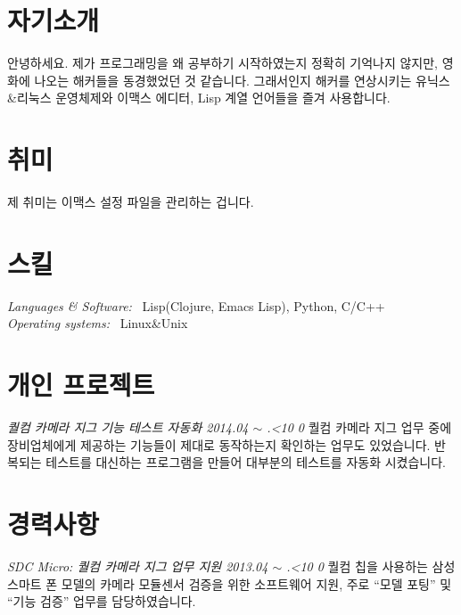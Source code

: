 \documentclass[line,margin]{res}
\renewcommand{\today}{\number\year.\ifnum\number\month<10 0\fi \number\month}
\begin{document}
\address{E-mail: vmfhrmfoaj@yahoo.com}


\begin{resume}

  \section{자기소개}

  안녕하세요.
  제가 프로그래밍을 왜 공부하기 시작하였는지 정확히 기억나지 않지만, 영화에 나오는 해커들을 동경했었던 것 같습니다.
  그래서인지 해커를 연상시키는 유닉스\&리눅스 운영체제와 이맥스 에디터, Lisp 계열 언어들을 즐겨 사용합니다.


  \section{취미}

  제 취미는 이맥스 설정 파일을 관리하는 겁니다.


  \section{스킬}

  {\sl Languages \& Software:} ~Lisp({\small Clojure, Emacs Lisp}), Python, C/C++ \\
  {\sl Operating systems:} ~Linux\&Unix


  \section{개인 프로젝트}

  {\sl 퀄컴 카메라 지그 기능 테스트 자동화 \hfill 2014.04 $\sim$ \today}
  \vspace{1mm}
  \newline
  {
    \small
    퀄컴 카메라 지그 업무 중에 장비업체에게 제공하는 기능들이 제대로 동작하는지 확인하는 업무도 있었습니다.
    반복되는 테스트를 대신하는 프로그램을 만들어 대부분의 테스트를 자동화 시켰습니다.
  }


  \section{경력사항}

  {\sl SDC Micro: 퀄컴 카메라 지그 업무 지원 \hfill 2013.04 $\sim$ \today}
  \vspace{1mm}
  \newline
  {
    \small
    퀄컴 칩을 사용하는 삼성 스마트 폰 모델의 카메라 모듈센서 검증을 위한 소프트웨어 지원,
    주로 ``모델 포팅'' 및 ``기능 검증'' 업무를 담당하였습니다.
  }


\end{resume}
\end{document}
